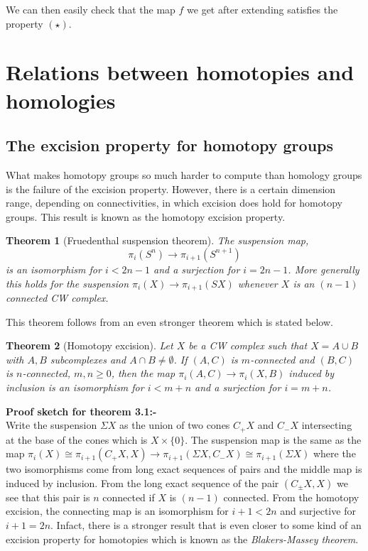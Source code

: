 \documentclass[12pt]{extarticle}
\numberwithin{equation}{section}
\newtheorem{thm}{Theorem}[section]
\newenvironment{Proof}[1]
    {\begin{mdframed}\textbf{#1} \\}
    {\end{mdframed}}
\begin{document}
We can then easily check that the map $f$ we get after extending satisfies the property $(\star)$.\\


\section{Relations between homotopies and homologies}

\subsection{The excision property for homotopy groups}
What makes homotopy groups so much harder to compute than homology groups
is the failure of the excision property. However, there is a certain dimension range,
depending on connectivities, in which excision does hold for homotopy groups. This result is known as the homotopy excision property.\\

\begin{thm}[Fruedenthal suspension theorem]
The suspension map, $$\pi_i(S^n)\to\pi_{i+1}(S^{n+1})$$ is an isomorphism for
$i<2n - 1$ and a surjection for $i = 2n - 1$. More generally this holds for the
suspension $\pi_i(X)\to \pi_{i+1}(S X)$ whenever $X$ is an $(n-1)$ connected CW complex.
\end{thm}

This theorem follows from an even stronger theorem which is stated below.

\begin{thm}[Homotopy excision]
\cite[p.~83]{May:1416976}
Let $X$ be a CW complex such that $X=A\cup B$ with $A,B$ subcomplexes and $A\cap B\neq\emptyset$. If $(A,C)$ is $m$-connected
and $(B,C)$ is $n$-connected, $m,n \geq 0$, then the map $\pi_i(A,C)\to\pi_i(X,B)$ induced by
inclusion is an isomorphism for $i < m+n$ and a surjection for $i =m+n$.
\end{thm}

\begin{Proof}{Proof sketch for theorem 3.1:-}
Write the suspension $\Sigma X$ as the union of two cones $C_+X$ and $C_-X$
intersecting at the base of the cones which is  $X\times\{0\}$. The suspension map is the same as the map $\pi_i(X) \cong \pi_{i+1}(C_+X,X) \longrightarrow \pi_{i+1}(\Sigma X,C_-X) \cong \pi_{i+1}(\Sigma X)$ where the two isomorphisms come from long exact sequences of pairs and the middle map is induced by inclusion. From the long exact sequence of the pair $(C_{\pm}X,X)$ we see that this pair is $n$ connected if $X$ is $(n-1)$ connected. From the homotopy excision, the connecting map is an isomorphism for $i+1 < 2n$ and surjective for $i+1 =2n$. Infact, there is a stronger result that is even closer to some kind of an excision property for homotopies which is known as the \emph{Blakers-Massey theorem}.\\
\end{Proof}
\end{document}
